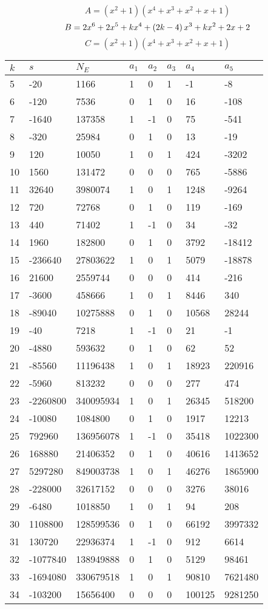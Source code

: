 \documentclass{amsart}
\begin{document}
$$A=(x^2
 + 1)(x^4
 + x^3
 + x^2
 + x
 + 1)$$
$$B=2\*x^6
 + 2\*x^5
 + k\*x^4
 + \left(2\*k
 - 4\right) \*x^3
 + k\*x^2
 + 2\*x
 + 2$$
$$C=(x^2
 + 1)(x^4
 + x^3
 + x^2
 + x
 + 1)$$
\begin{longtable}{|l|l|l|lllll|}
\hline
$k$ & $s$ & $N_E$ & $a_1$ & $a_2$ & $a_3$ & $a_4$ & $a_5$\\
\hline
5&-20&1166&1&0&1&-1&-8\\
6&-120&7536&0&1&0&16&-108\\
7&-1640&137358&1&-1&0&75&-541\\
8&-320&25984&0&1&0&13&-19\\
9&120&10050&1&0&1&424&-3202\\
10&1560&131472&0&0&0&765&-5886\\
11&32640&3980074&1&0&1&1248&-9264\\
12&720&72768&0&1&0&119&-169\\
13&440&71402&1&-1&0&34&-32\\
14&1960&182800&0&1&0&3792&-18412\\
15&-236640&27803622&1&0&1&5079&-18878\\
16&21600&2559744&0&0&0&414&-216\\
17&-3600&458666&1&0&1&8446&340\\
18&-89040&10275888&0&1&0&10568&28244\\
19&-40&7218&1&-1&0&21&-1\\
20&-4880&593632&0&1&0&62&52\\
21&-85560&11196438&1&0&1&18923&220916\\
22&-5960&813232&0&0&0&277&474\\
23&-2260800&340095934&1&0&1&26345&518200\\
24&-10080&1084800&0&1&0&1917&12213\\
25&792960&136956078&1&-1&0&35418&1022300\\
26&168880&21406352&0&1&0&40616&1413652\\
27&5297280&849003738&1&0&1&46276&1865900\\
28&-228000&32617152&0&0&0&3276&38016\\
29&-6480&1018850&1&0&1&94&208\\
30&1108800&128599536&0&1&0&66192&3997332\\
31&130720&22936374&1&-1&0&912&6614\\
32&-1077840&138949888&0&1&0&5129&98461\\
33&-1694080&330679518&1&0&1&90810&7621480\\
34&-103200&15656400&0&0&0&100125&9281250\\

\end{longtable}
\end{document}
